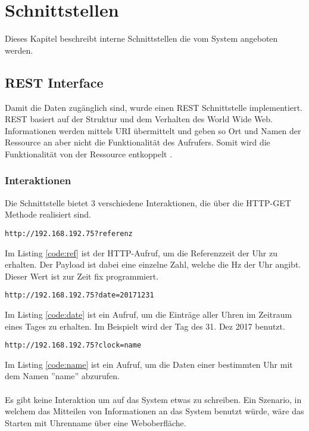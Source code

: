 \section{Schnittstellen}
Dieses Kapitel beschreibt interne Schnittstellen die vom System angeboten werden.
\subsection{REST Interface}\label{sec:rest}
Damit die Daten zugänglich sind, wurde einen REST Schnittstelle implementiert.\\
REST basiert auf der Struktur und dem Verhalten des World Wide Web. Informationen werden mittels URI übermittelt und geben so Ort und Namen der Ressource an aber nicht die Funktionalität des Aufrufers. Somit wird die Funktionalität von der Ressource entkoppelt \cite{rest}.
\subsubsection{Interaktionen}
Die Schnittstelle bietet 3 verschiedene Interaktionen, die über die HTTP-GET Methode realisiert sind.\\

\begin{lstlisting}[caption="Lesen der Referenzzeit",label={code:ref}]
http://192.168.192.75?referenz
\end{lstlisting}
Im Listing \ref{code:ref} ist der HTTP-Aufruf, um die Referenzzeit der Uhr zu erhalten. Der Payload ist dabei eine einzelne Zahl, welche die Hz der Uhr angibt. Dieser Wert ist zur Zeit fix programmiert.\\

\begin{lstlisting}[caption="Lesen eines bestimmten Tages",label={code:date}]
http://192.168.192.75?date=20171231
\end{lstlisting}
Im Listing \ref{code:date} ist ein Aufruf, um die Einträge aller Uhren im Zeitraum eines Tages zu erhalten. Im Beispielt wird der Tag des 31. Dez 2017 benutzt.\\

\begin{lstlisting}[caption="Lesen einer bestimmten Uhr",label={code:name}]
http://192.168.192.75?clock=name
\end{lstlisting}
Im Listing \ref{code:name} ist ein Aufruf, um die Daten einer bestimmten Uhr mit dem Namen ''name'' abzurufen.\\
\\
Es gibt keine Interaktion um auf das System etwas zu schreiben. Ein Szenario, in welchem das Mitteilen von Informationen an das System benutzt würde, wäre das Starten mit Uhrenname über eine Weboberfläche.

